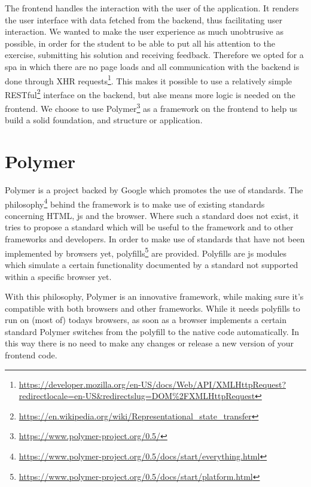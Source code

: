 %

The frontend handles the interaction with the user of the application.
It renders the user interface with data fetched from the backend,
thus facilitating user interaction.
We wanted to make the user experience as much unobtrusive as possible,
in order for the student to be able to put all his attention
to the exercise, submitting his solution and receiving feedback.
Therefore we opted for a \gls{spa}
in which there are no page loads
and all communication with the backend is done through
XHR requests\footnote{\url{https://developer.mozilla.org/en-US/docs/Web/API/XMLHttpRequest?redirectlocale=en-US&redirectslug=DOM\%2FXMLHttpRequest}}.
This makes it possible
to use a relatively simple
RESTful\footnote{\url{https://en.wikipedia.org/wiki/Representational_state_transfer}}
interface on the backend,
but alse means more logic is needed on the frontend.
We choose to use
Polymer\footnote{\url{https://www.polymer-project.org/0.5/}}
as a framework on the frontend
to help us build a solid foundation, and structure or application.

\section{Polymer}
Polymer is a project backed by Google which promotes the use of standards.
The philosophy\footnote{\url{https://www.polymer-project.org/0.5/docs/start/everything.html}}
behind the framework is to make use of existing standards
concerning HTML, \gls{js} and the browser.
Where such a standard does not exist,
it tries to propose a standard which will be useful to the framework
and to other frameworks and developers.
In order to make use of standards
that have not been implemented by browsers yet,
polyfills\footnote{\url{https://www.polymer-project.org/0.5/docs/start/platform.html}}
are provided.
Polyfills are \gls{js} modules
which simulate a certain functionality documented by a standard
not supported within a specific browser yet.

With this philosophy, Polymer is an innovative framework,
while making sure it's compatible with both browsers
and other frameworks.
While it needs polyfills to run on (most of) todays browsers,
as soon as a browser implements a certain standard
Polymer switches from the polyfill to the native code automatically.
In this way there is no need to make any changes or release a new version of 
your frontend code.

